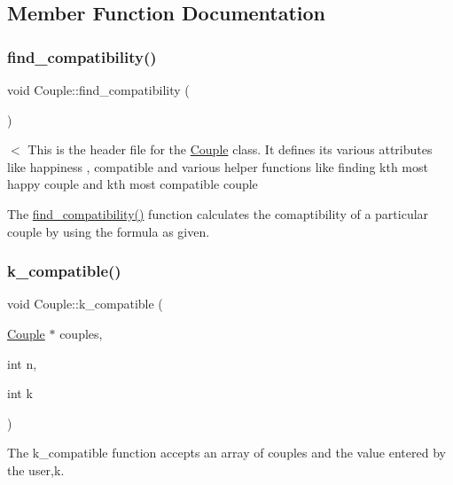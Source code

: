 \subsection{Member Function Documentation}
\mbox{\label{class_couple_afd44c116312fd411df285bde11e24b94}} 
\subsubsection{\texorpdfstring{find\+\_\+compatibility()}{find\_compatibility()}}
{\footnotesize\ttfamily void Couple\+::find\+\_\+compatibility (\begin{DoxyParamCaption}{ }\end{DoxyParamCaption})}



$<$ This is the header file for the \hyperlink{class_couple}{Couple} class. It defines it\textquotesingle{}s various attributes like happiness , compatible and various helper functions like finding kth most happy couple and kth most compatible couple 

The \hyperlink{class_couple_afd44c116312fd411df285bde11e24b94}{find\+\_\+compatibility()} function calculates the comaptibility of a particular couple by using the formula as given. \mbox{\label{class_couple_ae93d0b2f169c7e21a3822bbf60fe0f14}} 
\subsubsection{\texorpdfstring{k\+\_\+compatible()}{k\_compatible()}}
{\footnotesize\ttfamily void Couple\+::k\+\_\+compatible (\begin{DoxyParamCaption}\item[{\hyperlink{class_couple}{Couple} $\ast$}]{couples,  }\item[{int}]{n,  }\item[{int}]{k }\end{DoxyParamCaption})\hspace{0.3cm}{\ttfamily [static]}}



The k\+\_\+compatible function accepts an array of couples and the value entered by the user,k. 

